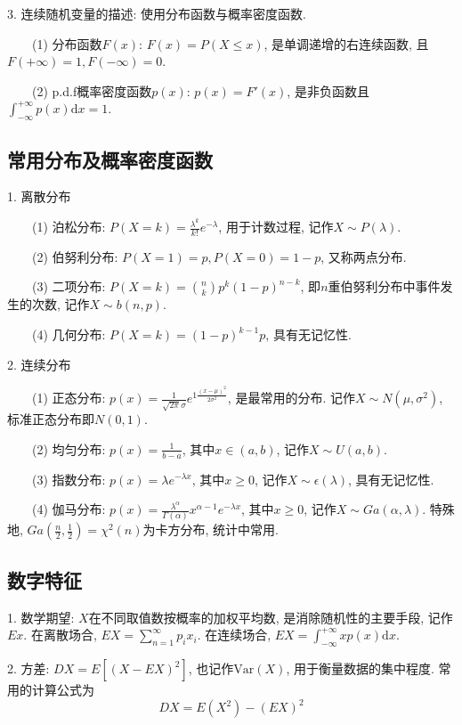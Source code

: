 3. 连续随机变量的描述: 使用分布函数与概率密度函数.

~~~~(1) 分布函数$F(x)$: $F(x)=P(X \leq x)$, 是单调递增的右连续函数, 且$F(+\infty)=1, F(-\infty)=0$.

~~~~(2) p.d.f概率密度函数$p(x)$: $p(x)=F'(x)$, 是非负函数且$\int_{-\infty}^{+\infty} p(x)\mathrm{d}x=1$.

\subsection{常用分布及概率密度函数}

1. 离散分布

~~~~(1) 泊松分布: $P(X=k)=\frac{\lambda^k}{k!}e^{-\lambda}$, 用于计数过程, 记作$X\sim P(\lambda)$.

~~~~(2) 伯努利分布: $P(X=1)=p, P(X=0)=1-p$, 又称两点分布.

~~~~(3) 二项分布: $P(X=k)=\binom{n}{k}p^k(1-p)^{n-k}$, 即$n$重伯努利分布中事件发生的次数, 记作$X\sim b(n,p)$.

~~~~(4) 几何分布: $P(X=k)=(1-p)^{k-1}p$, 具有无记忆性.

2. 连续分布

~~~~(1) 正态分布: $p(x)=\frac{1}{\sqrt{2\pi}\sigma}e^{1\frac{(x-\mu)^2}{2\sigma^2}}$, 是最常用的分布. 记作$X\sim N(\mu, \sigma^2)$, 标准正态分布即$N(0,1)$.

~~~~(2) 均匀分布: $p(x)=\frac{1}{b-a}$, 其中$x \in (a,b)$, 记作$X \sim U(a,b)$.

~~~~(3) 指数分布: $p(x)=\lambda e^{-\lambda x}$, 其中$x \geq 0$, 记作$X\sim \epsilon(\lambda)$, 具有无记忆性.

~~~~(4) 伽马分布: $p(x)=\frac{\lambda^\alpha}{\Gamma(\alpha)}x^{\alpha-1}e^{-\lambda x}$, 其中$x\geq 0$, 记作$X\sim Ga(\alpha,\lambda)$. 特殊地, $Ga(\frac{n}{2},\frac{1}{2})=\chi^2(n)$为卡方分布, 统计中常用.

\subsection{数字特征}

1. 数学期望: $X$在不同取值数按概率的加权平均数, 是消除随机性的主要手段, 记作$Ex$.
在离散场合, $EX=\sum\limits_{n=1}^\infty p_ix_i$. 在连续场合, $EX=\int_{-\infty}^{+\infty}xp(x)\mathrm{d}x$.

2. 方差: $DX=E[(X-EX)^2]$, 也记作$\text{Var}(X)$, 用于衡量数据的集中程度. 常用的计算公式为
\begin{equation*}
    DX=E(X^2)-(EX)^2
\end{equation*}


